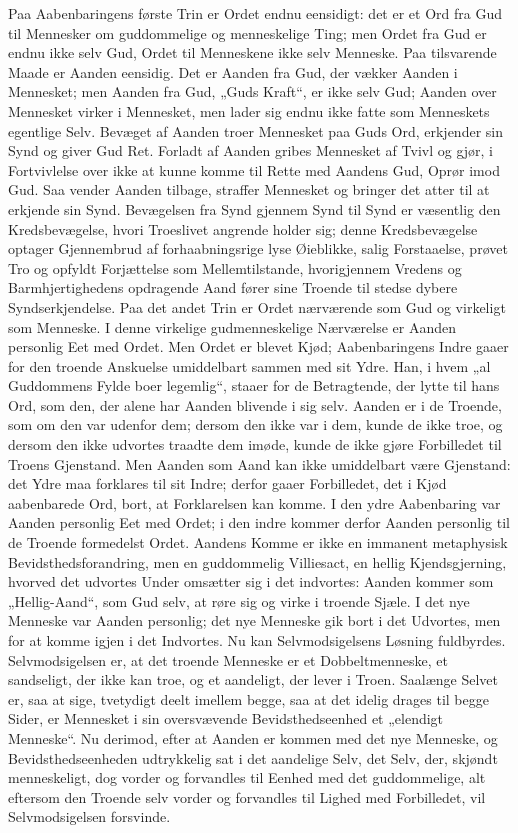 \documentclass[12pt]{book}
\begin{document}
Paa Aabenbaringens første Trin er Ordet endnu eensidigt: det er et
Ord fra Gud til Mennesker om guddommelige og menneskelige Ting; men
Ordet fra Gud er endnu ikke selv Gud, Ordet til Menneskene ikke selv
Menneske. Paa tilsvarende Maade er Aanden eensidig. Det er Aanden
fra Gud, der vækker Aanden i Mennesket; men Aanden fra Gud, „Guds
Kraft“, er ikke selv Gud; Aanden over Mennesket virker i Mennesket,
men lader sig endnu ikke fatte som Menneskets egentlige Selv.
Bevæget af Aanden troer Mennesket paa Guds Ord, erkjender sin Synd
og giver Gud Ret. Forladt af Aanden gribes Mennesket af Tvivl og
gjør, i Fortvivlelse over ikke at kunne komme til Rette med Aandens
Gud, Oprør imod Gud. Saa vender Aanden tilbage, straffer Mennesket
og bringer det atter til at erkjende sin Synd. Bevægelsen fra Synd
gjennem Synd til Synd er væsentlig den Kredsbevægelse, hvori
Troeslivet angrende holder sig; denne Kredsbevægelse optager
Gjennembrud af forhaabningsrige lyse Øieblikke, salig Forstaaelse,
prøvet Tro og opfyldt Forjættelse som Mellemtilstande, hvorigjennem
Vredens og Barmhjertighedens opdragende Aand fører sine Troende til
stedse dybere Syndserkjendelse. Paa det andet Trin er Ordet
nærværende som Gud og virkeligt som Menneske. I denne virkelige
gudmenneskelige Nærværelse er Aanden personlig Eet med Ordet. Men
Ordet er blevet Kjød; Aabenbaringens Indre gaaer for den troende
Anskuelse umiddelbart sammen med sit Ydre. Han, i hvem „al
Guddommens Fylde boer legemlig“, staaer for
de Betragtende, der lytte til hans Ord, som den, der alene har
Aanden blivende i sig selv. Aanden er i de Troende, som om den var
udenfor dem; dersom den ikke var i dem, kunde de ikke troe, og
dersom den ikke udvortes traadte dem imøde, kunde de ikke gjøre
Forbilledet til Troens Gjenstand. Men Aanden som Aand kan ikke
umiddelbart være Gjenstand: det Ydre maa forklares til sit Indre;
derfor gaaer Forbilledet, det i Kjød aabenbarede Ord, bort, at
Forklarelsen kan komme. I den ydre Aabenbaring var Aanden personlig
Eet med Ordet; i den indre kommer derfor Aanden personlig til de
Troende formedelst Ordet. Aandens Komme er ikke en immanent
metaphysisk Bevidsthedsforandring, men en guddommelig Villiesact, en
hellig Kjendsgjerning, hvorved det udvortes Under omsætter sig i det
indvortes: Aanden kommer som „Hellig-Aand“, som Gud selv, at røre
sig og virke i troende Sjæle. I det nye Menneske var Aanden
personlig; det nye Menneske gik bort i det Udvortes, men for at
komme igjen i det Indvortes. Nu kan Selvmodsigelsens Løsning
fuldbyrdes. Selvmodsigelsen er, at det troende Menneske er et
Dobbeltmenneske, et sandseligt, der ikke kan troe, og et aandeligt,
der lever i Troen. Saalænge Selvet er, saa at sige, tvetydigt deelt
imellem begge, saa at det idelig drages til begge Sider, er
Mennesket i sin oversvævende Bevidsthedseenhed et „elendigt
Menneske“. Nu derimod, efter at Aanden er kommen med det nye
Menneske, og Bevidsthedseenheden udtrykkelig sat i det aandelige
Selv, det Selv, der, skjøndt menneskeligt, dog vorder og forvandles
til Eenhed med det guddommelige, alt eftersom den Troende selv
vorder og forvandles til Lighed med Forbilledet, vil
Selvmodsigelsen forsvinde.
\end{document}

